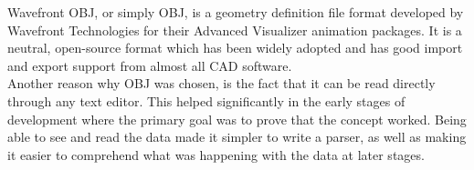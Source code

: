 Wavefront OBJ, or simply OBJ, is a geometry definition file format developed by Wavefront Technologies for their Advanced Visualizer animation packages\cite{bib:OBJ}. It is a neutral, open-source format which has been widely adopted and has good import and export support from almost all \acs{CAD} software.\\
Another reason why OBJ was chosen, is the fact that it can be read directly through any text editor. This helped significantly in the early stages of development where the primary goal was to prove that the concept worked. Being able to see and read the data made it simpler to write a parser, as well as making it easier to comprehend what was happening with the data at later stages.\\
\begin{table}[htbp]
	\centering 
	\caption[OBJ Types]{Relevant types in OBJ format}
	\label{tab:ObjTypes}
\end{table}

